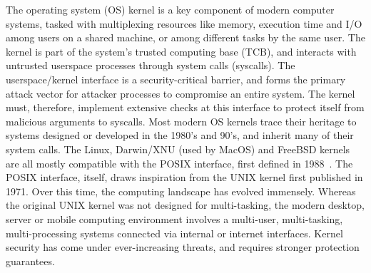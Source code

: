 The operating system (OS) kernel is a key component of modern computer systems,
tasked with multiplexing resources like memory, execution time and I/O among
users on a shared machine, or among different tasks by the same user.
The kernel is part of the system's trusted computing base (TCB), and interacts
with untrusted userspace processes through system calls (syscalls).
The userspace/kernel interface is a security-critical barrier, and forms the
primary attack vector for attacker processes to compromise an entire system.
The kernel must, therefore, implement extensive checks at this interface to
protect itself from malicious arguments to syscalls.
Most modern OS kernels trace their heritage to systems designed or developed in
the 1980's and 90's, and inherit many of their system calls.
The Linux, Darwin/XNU (used by MacOS) and FreeBSD kernels are all 
mostly compatible with the POSIX interface, first defined in 
1988~\cite{AtlidakisAGMN16}.
The POSIX interface, itself, draws inspiration from the UNIX kernel first
published in 1971.
Over this time, the computing landscape has evolved immensely.
Whereas the original UNIX kernel was not designed for multi-tasking, the
modern desktop, server or mobile computing environment involves a 
multi-user, multi-tasking, multi-processing systems connected via internal
or internet interfaces.
Kernel security has come under ever-increasing threats, and requires stronger
protection guarantees.

